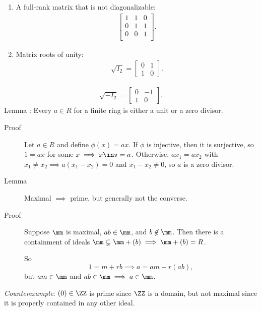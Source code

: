 \begin{enumerate}
\def\labelenumi{\arabic{enumi}.}
\setcounter{enumi}{3}
\item
  A full-rank matrix that is not diagonalizable: \begin{align*}
  \left[\begin{array}{ccc}
  1 & 1 & 0 \\
  0 & 1 & 1 \\
  0 & 0 & 1 \\
  \end{array}\right]
  .\end{align*}
\item
  Matrix roots of unity: \begin{align*} \sqrt{I_2} =
  \left[\begin{array}{cc}
  0 & 1\\
  1 & 0
  \end{array}\right]
  .\end{align*}
\end{enumerate}

\begin{align*} \sqrt{-I_2} =
\left[\begin{array}{cc}
0 & -1\\
1 & 0
\end{array}\right]
.\end{align*} Lemma : Every \(a\in R\) for a finite ring is either a
unit or a zero divisor.

\begin{description}
\item[Proof]
Let \(a\in R\) and define \(\phi(x) = ax\). If \(\phi\) is injective,
then it is surjective, so \(1 = ax\) for some \(x \implies x\inv = a\).
Otherwise, \(ax_1 = ax_2\) with
\(x_1 \neq x_2 \implies a(x_1 - x_2) = 0\) and \(x_1 - x_2 \neq 0\), so
\(a\) is a zero divisor.
\item[Lemma]
Maximal \(\implies\) prime, but generally not the converse.
\item[Proof]
Suppose \(\mm\) is maximal, \(ab\in \mm\), and \(b\not\in \mm\). Then
there is a containment of ideals
\(\mm \subsetneq \mm + (b) \implies \mm + (b) = R\).

So \[
1 = m + rb \implies a = am + r(ab)
,\] but \(am\in \mm\) and \(ab\in \mm \implies a\in \mm\).
\end{description}

\emph{Counterexample}: \((0) \in \ZZ\) is prime since \(\ZZ\) is a
domain, but not maximal since it is properly contained in any other
ideal.

